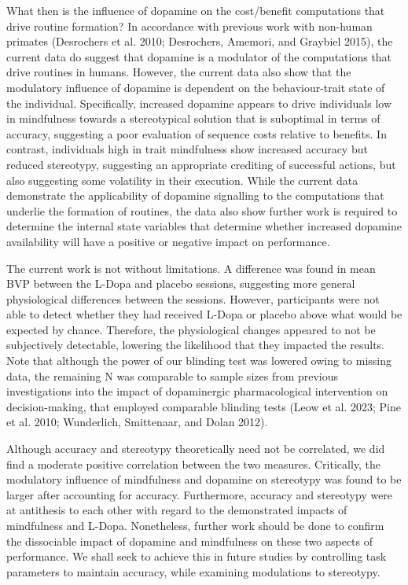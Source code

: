 \documentclass{article}
\begin{document}
What then is the influence of dopamine on the cost/benefit computations
that drive routine formation? In accordance with previous work with
non-human primates (Desrochers et al. 2010; Desrochers, Amemori, and
Graybiel 2015), the current data do suggest that dopamine is a modulator
of the computations that drive routines in humans. However, the current
data also show that the modulatory influence of dopamine is dependent on
the behaviour-trait state of the individual. Specifically, increased
dopamine appears to drive individuals low in mindfulness towards a
stereotypical solution that is suboptimal in terms of accuracy,
suggesting a poor evaluation of sequence costs relative to benefits. In
contrast, individuals high in trait mindfulness show increased accuracy
but reduced stereotypy, suggesting an appropriate crediting of
successful actions, but also suggesting some volatility in their
execution. While the current data demonstrate the applicability of
dopamine signalling to the computations that underlie the formation of
routines, the data also show further work is required to determine the
internal state variables that determine whether increased dopamine
availability will have a positive or negative impact on performance.

The current work is not without limitations. A difference was found in
mean BVP between the L-Dopa and placebo sessions, suggesting more
general physiological differences between the sessions. However,
participants were not able to detect whether they had received L-Dopa or
placebo above what would be expected by chance. Therefore, the
physiological changes appeared to not be subjectively detectable,
lowering the likelihood that they impacted the results. Note that
although the power of our blinding test was lowered owing to missing
data, the remaining N was comparable to sample sizes from previous
investigations into the impact of dopaminergic pharmacological
intervention on decision-making, that employed comparable blinding tests
(Leow et al. 2023; Pine et al. 2010; Wunderlich, Smittenaar, and Dolan
2012).

Although accuracy and stereotypy theoretically need not be correlated,
we did find a moderate positive correlation between the two measures.
Critically, the modulatory influence of mindfulness and dopamine on
stereotypy was found to be larger after accounting for accuracy.
Furthermore, accuracy and stereotypy were at antithesis to each other
with regard to the demonstrated impacts of mindfulness and L-Dopa.
Nonetheless, further work should be done to confirm the dissociable
impact of dopamine and mindfulness on these two aspects of performance.
We shall seek to achieve this in future studies by controlling task
parameters to maintain accuracy, while examining modulations to
stereotypy.
\end{document}
